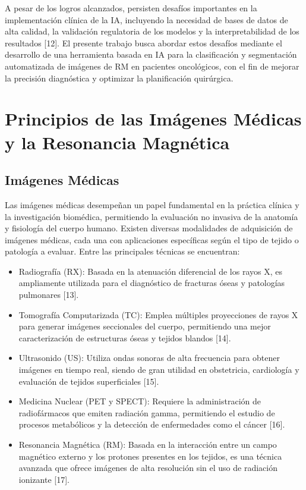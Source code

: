 A pesar de los logros alcanzados, persisten desafíos importantes en la implementación clínica de la IA, incluyendo la necesidad de bases de datos de alta calidad, la validación regulatoria de los modelos y la interpretabilidad de los resultados [12]. El presente trabajo busca abordar estos desafíos mediante el desarrollo de una herramienta basada en IA para la clasificación y segmentación automatizada de imágenes de RM en pacientes oncológicos, con el fin de mejorar la precisión diagnóstica y optimizar la planificación quirúrgica.
        
\section{Principios de las Imágenes Médicas y la Resonancia Magnética} \label{sec:principios}
\subsection{Imágenes Médicas}

Las imágenes médicas desempeñan un papel fundamental en la práctica clínica y la investigación biomédica, permitiendo la evaluación no invasiva de la anatomía y fisiología del cuerpo humano. Existen diversas modalidades de adquisición de imágenes médicas, cada una con aplicaciones específicas según el tipo de tejido o patología a evaluar. Entre las principales técnicas se encuentran:
    \begin{itemize}
        \item Radiografía (RX): Basada en la atenuación diferencial de los rayos X, es ampliamente utilizada para el diagnóstico de fracturas óseas y patologías pulmonares [13].
        \item Tomografía Computarizada (TC): Emplea múltiples proyecciones de rayos X para generar imágenes seccionales del cuerpo, permitiendo una mejor caracterización de estructuras óseas y tejidos blandos [14].
        \item Ultrasonido (US): Utiliza ondas sonoras de alta frecuencia para obtener imágenes en tiempo real, siendo de gran utilidad en obstetricia, cardiología y evaluación de tejidos superficiales [15].
        \item Medicina Nuclear (PET y SPECT): Requiere la administración de radiofármacos que emiten radiación gamma, permitiendo el estudio de procesos metabólicos y la detección de enfermedades como el cáncer [16].
        \item Resonancia Magnética (RM): Basada en la interacción entre un campo magnético externo y los protones presentes en los tejidos, es una técnica avanzada que ofrece imágenes de alta resolución sin el uso de radiación ionizante [17].
    \end{itemize}

